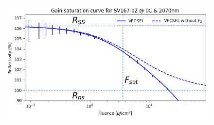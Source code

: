 \begin{figure}[h]
    \centering
    \includegraphics[width=12cm]{images/gainSat.png}
    \caption{}
\end{figure}